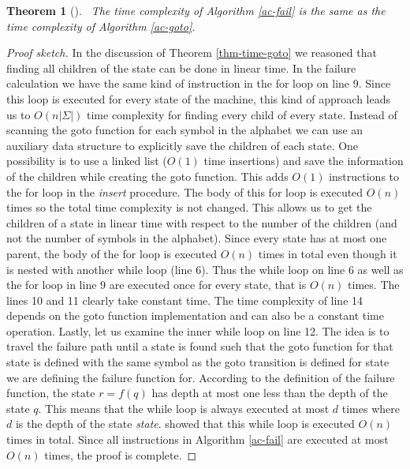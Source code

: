 \documentclass[english,twoside,censored,csm,algorithms-track-2020]{HYthesisML}
\theoremstyle{plain}
\newtheorem{theorem}{Theorem}[chapter]
\theoremstyle{definition}
\begin{document}
\begin{theorem}[]~\label{thm-time-failure}
    The time complexity of Algorithm \ref{ac-fail} is the same as the time complexity of
  Algorithm \ref{ac-goto}.
\end{theorem}
\begin{proof}[Proof sketch]
In the discussion of Theorem
\ref{thm-time-goto} we reasoned that finding all children of the state can be done in
linear time. In the failure calculation we have the same kind of instruction in the for loop
on line 9. Since this loop is executed for every state of the machine, this kind of approach leads
us to $O(n|\Sigma|)$ time complexity for finding every child of every state. Instead of scanning
the goto function for each symbol in the alphabet we can use an auxiliary data structure to
explicitly save the children of each state. One possibility is to use a linked list ($O(1)$ time
insertions) and save the information of the children while creating the goto function. This adds
$O(1)$ instructions to the for loop in the \textit{insert} procedure. The body of this for loop
is executed $O(n)$ times so the total time complexity is not changed. This allows us to get the
children of a state in linear time with respect to the number of the children (and not the number of
symbols in the alphabet). Since every state
has at most one parent, the body of the for loop is executed $O(n)$ times in total even though it
is nested with another while loop (line 6). Thus the while loop on line 6 as well as the for loop in
line 9 are executed once for every state, that is $O(n)$ times. The lines 10 and 11 clearly take constant
time. The time complexity of line 14 depends on the goto function implementation and
can also be a constant time operation. Lastly, let us examine the inner while loop on line 12.
The idea is to travel the failure path until a state is found such that the goto function
for that state is defined with the same symbol as the goto transition is defined for state we are
defining the failure function for. According to the definition of the failure function, the state
$r=f(q)$ has depth at most one less than the depth of the state $q$. This means that the while
loop is always executed at most $d$ times where $d$ is the depth of the state \textit{state}.
\citep{Aho75} showed that this while loop is executed $O(n)$ times in total. Since all instructions
in Algorithm \ref{ac-fail} are executed at most $O(n)$ times, the proof is complete.

\end{proof}
\end{document}
